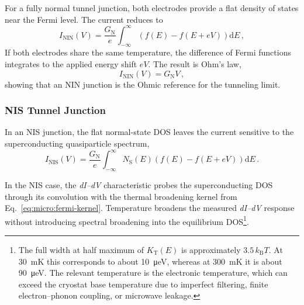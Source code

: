             For a fully normal tunnel junction, both electrodes provide a flat density of states near the Fermi level. The current reduces to
            \begin{equation}
                I_\mathrm{NIN}(V) = \frac{G_\mathrm{N}}{e} \int_{-\infty}^{\infty}\left(f(E) - f(E + eV)\right)\mathrm{d}E\,,
            \end{equation}
            If both electrodes share the same temperature, the difference of Fermi functions integrates to the applied energy shift $eV$. The result is Ohm's law,
            \begin{equation}
                I_\mathrm{NIN}(V) =  G_\mathrm{N}V\,,
            \end{equation}
            showing that an NIN junction is the Ohmic reference for the tunneling limit.

        \subsubsection*{NIS Tunnel Junction}

            In an NIS junction, the flat normal-state DOS leaves the current sensitive to the superconducting quasiparticle spectrum,
            \begin{equation}
                I_\mathrm{NIS}(V) = \frac{G_\mathrm{N}}{e} \int_{-\infty}^{\infty} N_\mathrm{S}(E) \left(f(E) - f(E + eV)\right) \mathrm{d}E\,.
                \label{eq:micro:tunnel-nis}
            \end{equation}

            In the NIS case, the \textit{dI--dV} characteristic probes the superconducting DOS through its convolution with the thermal broadening kernel from Eq.~\eqref{eq:micro:fermi-kernel}. Temperature broadens the measured \textit{dI--dV} response without introducing spectral broadening into the equilibrium DOS\footnote{
                The full width at half maximum of $K_\mathrm{T}(E)$ is approximately $3.5\,k_\mathrm{B}T$. At \qty{30}{\milli\kelvin} this corresponds to about \qty{10}{\micro\electronvolt}, whereas at \qty{300}{\milli\kelvin} it is about \qty{90}{\micro\electronvolt}. The relevant temperature is the electronic temperature, which can exceed the cryostat base temperature due to imperfect filtering, finite electron--phonon coupling, or microwave leakage.
            }.

